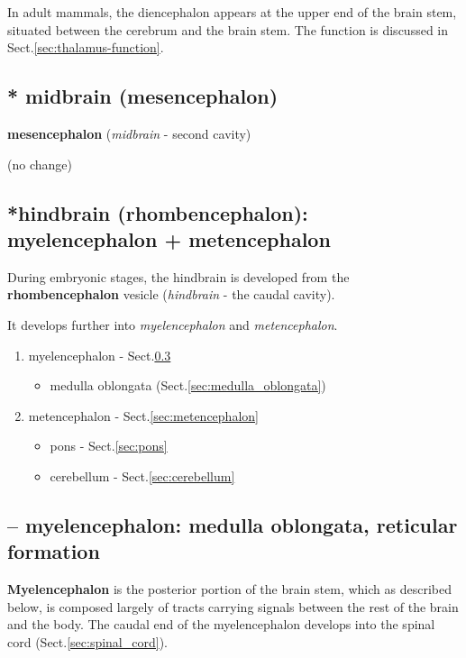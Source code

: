 In adult mammals, the diencephalon appears at the upper end of the brain stem,
situated between the cerebrum and the brain stem. The function is discussed in
Sect.\ref{sec:thalamus-function}.

  

\subsection{* midbrain (mesencephalon)}

{\bf mesencephalon} ({\it midbrain} - second cavity)
  
(no change)

\subsection{*hindbrain (rhombencephalon): myelencephalon + metencephalon}
\label{sec:hindbrain}

During embryonic stages, the hindbrain is developed from the {\bf
rhombencephalon} vesicle ({\it hindbrain} - the caudal cavity). 

It develops further into {\it myelencephalon} and
{\it metencephalon}.

\begin{enumerate}
  \item myelencephalon - Sect.\ref{sec:myelencephalon}
  \begin{itemize}
    \item  medulla oblongata (Sect.\ref{sec:medulla_oblongata}) 
  \end{itemize}

  \item metencephalon - Sect.\ref{sec:metencephalon}
  \begin{itemize}
    \item pons - Sect.\ref{sec:pons}
    \item cerebellum - Sect.\ref{sec:cerebellum}
  \end{itemize}
\end{enumerate}

\subsection{--  myelencephalon: medulla oblongata, reticular formation}
\label{sec:myelencephalon}

{\bf Myelencephalon} is the posterior portion of the brain stem, which as
described below, is composed largely of tracts carrying signals between the rest
of the brain and the body. The caudal end of the myelencephalon develops into
the spinal cord  (Sect.\ref{sec:spinal_cord}).

